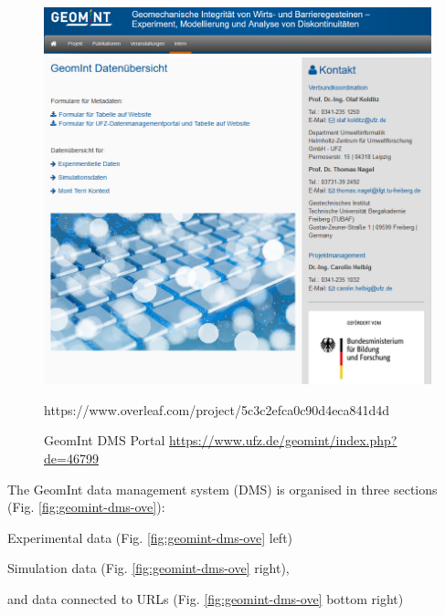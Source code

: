 \begin{figure}[!ht]
\includegraphics[width=\textwidth]{figures/geomint-web-01.png}
\includegraphics[width=\textwidth]{figures/geomint-dms-01.png}
\caption{GeomInt DMS Portal \url{https://www.ufz.de/geomint/index.php?de=46799}}
\label{fig:geomint-dms-web}https://www.overleaf.com/project/5c3c2efca0c90d4eca841d4d
\end{figure}

The GeomInt data management system (DMS) is organised in three sections (Fig. \ref{fig:geomint-dms-ove}):
\begin{list}{-}{\leftmargin=1em \itemindent=0em \itemsep=0em}
\item Experimental data (Fig. \ref{fig:geomint-dms-ove} left)
\item Simulation data (Fig. \ref{fig:geomint-dms-ove} right),
\item and data connected to URLs (Fig. \ref{fig:geomint-dms-ove} bottom right)
\end{list}

